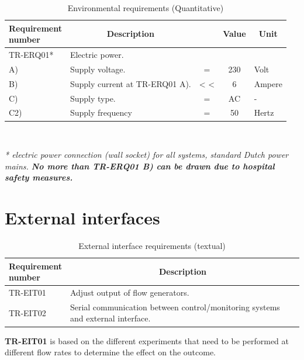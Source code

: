 \begin{table}[H]
\caption{Environmental requirements (Quantitative)}
\label{tab:envirreq_quan}
\begin{tabular}{l|p{65mm}ccp{20mm}|}
	\makecell[l]{\textbf{Requirement} \\  \textbf{number}} & \multicolumn{1}{c}{\textbf{Description}} & \multicolumn{1}{c}{ } & \multicolumn{1}{c}{\textbf{Value}} & \multicolumn{1}{c}{\textbf{Unit}} \\
	\hline	
	TR-ERQ01* &  Electric power. &  &  &  \\
	\hspace{1.5cm} A) & Supply voltage. 	& = 	& 230 	& Volt \\
	\hspace{1.5cm} B) & Supply current at TR-ERQ01 A). 	& < < 	& 6		& Ampere \\
	\hspace{1.5cm} C) & Supply type. 		& = 	& AC 	& - \\
	\hspace{1.5cm} C2) & Supply frequency	& =		& 50	& Hertz \\
	\cline{2-5}
\end{tabular} \\
\raggedright
\textit{* electric power connection (wall socket) for all systems, standard Dutch power mains. \textbf{No more than TR-ERQ01 B) can be drawn due to hospital safety measures.}}
\end{table}

\section{External interfaces}
\begin{table} [H]
\caption{External interface requirements (textual)}
\label{tab:extint_text}
\begin{tabular}{l|p{120mm}|}
	\makecell[l]{\textbf{Requirement} \\ \textbf{number}} & \multicolumn{1}{c}{\textbf{Description}}\\
	\hline
	TR-EIT01 & Adjust output of flow generators. \\
	TR-EIT02 & Serial communication between control/monitoring systems and external interface.\\
	\cline{2-2}
\end{tabular}
\end{table}

\textbf{TR-EIT01} is based on the different experiments that need to be performed at different flow rates to determine the effect on the outcome.

